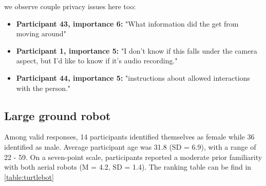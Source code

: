 \documentclass[letterpaper, 10 pt, conference]{ieeeconf}  %
\begin{document}
we observe couple privacy issues here too:
\begin{itemize}
    \item  \textbf{Participant 43, importance 6:} "What information did the get from moving around"
    \item  \textbf{Participant 1, importance 5:} "I don't know if this falls under the camera aspect, but I'd like to know if it's audio recording."
    \item  \textbf{Participant 44, importance 5:} "instructions about allowed interactions with the person."
\end{itemize}

\subsection{Large ground robot}

Among valid responses, 14 participants identified themselves as female while 36 identified as male. Average participant age was 31.8 (SD = 6.9), with a range of 22 - 59. On a seven-point scale, participants reported a moderate prior familiarity with both aerial robots (M = 4.2, SD = 1.4). The ranking table can be find in \ref{table:turtlebot}
\end{document}

